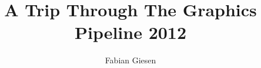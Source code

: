 \documentclass[DIV10]{scrreprt}
\begin{document}


\title{A Trip Through The Graphics Pipeline 2012}
\author{Fabian Giesen}
\maketitle
\tableofcontents




\end{document}
